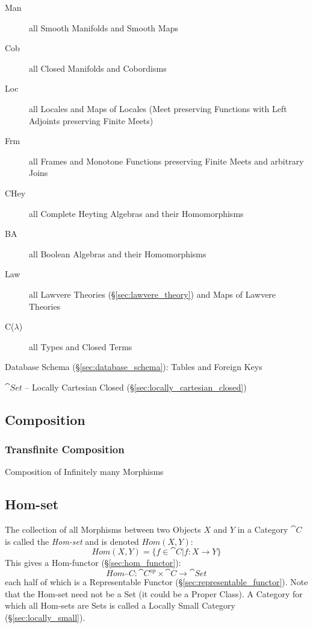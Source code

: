 \begin{description}
\item [Man] all Smooth Manifolds and Smooth Maps
\item [Cob] all Closed Manifolds and Cobordisms
\item [Loc] all Locales and Maps of Locales (Meet preserving Functions
  with Left Adjoints preserving Finite Meets)
\item [Frm] all Frames and Monotone Functions preserving Finite Meets
  and arbitrary Joins
\item [CHey] all Complete Heyting Algebras and their Homomorphisms
\item [BA] all Boolean Algebras and their Homomorphisms
\item [Law] all Lawvere Theories (\S\ref{sec:lawvere_theory}) and Maps
  of Lawvere Theories
\item [C($\lambda$)] all Types and Closed Terms
\end{description}

Database Schema (\S\ref{sec:database_schema}): Tables and Foreign Keys

$\cat{Set}$ -- Locally Cartesian Closed
(\S\ref{sec:locally_cartesian_closed})



\subsection{Composition}\label{sec:composition}

\subsubsection{Transfinite Composition}
\label{sec:transfinite_composition}

Composition of Infinitely many Morphisms



\subsection{Hom-set}\label{sec:hom_set}

The collection of all Morphisms between two Objects $X$ and $Y$ in a
Category $\cat{C}$ is called the \emph{Hom-set} and is denoted
$Hom(X,Y)$:
\[
  Hom(X,Y) = \{f \in \cat{C} | f : X \rightarrow Y\}
\]
This gives a Hom-functor (\S\ref{sec:hom_functor}):
\[
  Hom_\cat{C} : \cat{C^{op}} \times \cat{C} \rightarrow \cat{Set}
\]
each half of which is a Representable Functor
(\S\ref{sec:representable_functor}).
\newline
\fist Note that the Hom-set need not be a Set (it could be a
Proper Class). A Category for which all Hom-sets are Sets is called a
Locally Small Category (\S\ref{sec:locally_small}).

